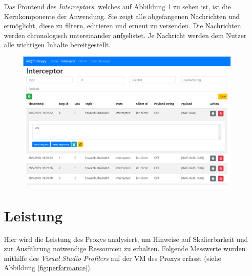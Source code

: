     Das Frontend des \emph{Interceptors}, welches auf Abbildung \ref{fig:frontend_messages} zu sehen ist, ist die Kernkomponente der Anwendung. Sie zeigt alle abgefangenen Nachrichten und ermöglicht, diese zu filtern, editieren und erneut zu versenden. Die Nachrichten werden chronologisch untereinander aufgelistet. Je Nachricht werden dem Nutzer alle wichtigen Inhalte bereitgestellt.
    \begin{figure}[!h]%
        \centering
        \includegraphics[width=14cm]{tex/bilder/6_validierung/FrontendInterceptor.png}
        \label{fig:frontend_messages}
    \end{figure}

\section{Leistung}
    Hier wird die Leistung des Proxys analysiert, um Hinweise auf Skalierbarkeit und zur Ausführung notwendige Ressourcen zu erhalten.
    Folgende Messwerte wurden mithilfe des \emph{Visual Studio Profilers} auf der \ac{VM} des Proxys erfasst (siehe Abbildung \ref{fig:performance}).
    
